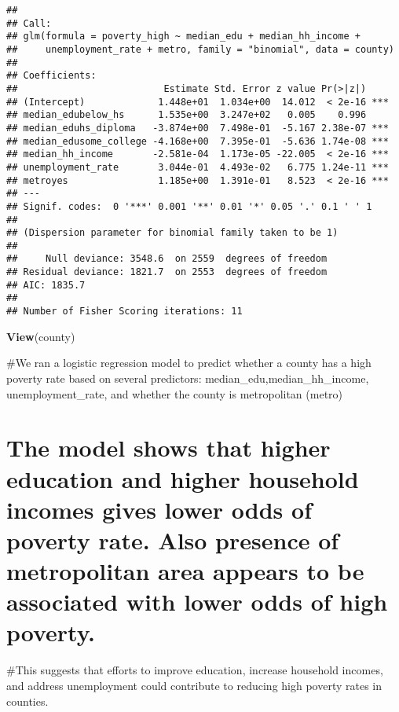\documentclass[
]{article}
\newenvironment{Shaded}{\begin{snugshade}}{\end{snugshade}}
\newcommand{\FunctionTok}[1]{\textcolor[rgb]{0.13,0.29,0.53}{\textbf{#1}}}
\newcommand{\NormalTok}[1]{#1}
\begin{document}
\begin{verbatim}
## 
## Call:
## glm(formula = poverty_high ~ median_edu + median_hh_income + 
##     unemployment_rate + metro, family = "binomial", data = county)
## 
## Coefficients:
##                          Estimate Std. Error z value Pr(>|z|)    
## (Intercept)             1.448e+01  1.034e+00  14.012  < 2e-16 ***
## median_edubelow_hs      1.535e+00  3.247e+02   0.005    0.996    
## median_eduhs_diploma   -3.874e+00  7.498e-01  -5.167 2.38e-07 ***
## median_edusome_college -4.168e+00  7.395e-01  -5.636 1.74e-08 ***
## median_hh_income       -2.581e-04  1.173e-05 -22.005  < 2e-16 ***
## unemployment_rate       3.044e-01  4.493e-02   6.775 1.24e-11 ***
## metroyes                1.185e+00  1.391e-01   8.523  < 2e-16 ***
## ---
## Signif. codes:  0 '***' 0.001 '**' 0.01 '*' 0.05 '.' 0.1 ' ' 1
## 
## (Dispersion parameter for binomial family taken to be 1)
## 
##     Null deviance: 3548.6  on 2559  degrees of freedom
## Residual deviance: 1821.7  on 2553  degrees of freedom
## AIC: 1835.7
## 
## Number of Fisher Scoring iterations: 11
\end{verbatim}

\begin{Shaded}
\begin{Highlighting}[]
\FunctionTok{View}\NormalTok{(county)}
\end{Highlighting}
\end{Shaded}

\#We ran a logistic regression model to predict whether a county has a
high poverty rate based on several predictors:
median\_edu,median\_hh\_income, unemployment\_rate, and whether the
county is metropolitan (metro)

\hypertarget{the-model-shows-that-higher-education-and-higher-household-incomes-gives-lower-odds-of-poverty-rate.-also-presence-of-metropolitan-area-appears-to-be-associated-with-lower-odds-of-high-poverty.}{%
\section{The model shows that higher education and higher household
incomes gives lower odds of poverty rate. Also presence of metropolitan
area appears to be associated with lower odds of high
poverty.}\label{the-model-shows-that-higher-education-and-higher-household-incomes-gives-lower-odds-of-poverty-rate.-also-presence-of-metropolitan-area-appears-to-be-associated-with-lower-odds-of-high-poverty.}}

\#This suggests that efforts to improve education, increase household
incomes, and address unemployment could contribute to reducing high
poverty rates in counties.
\end{document}

